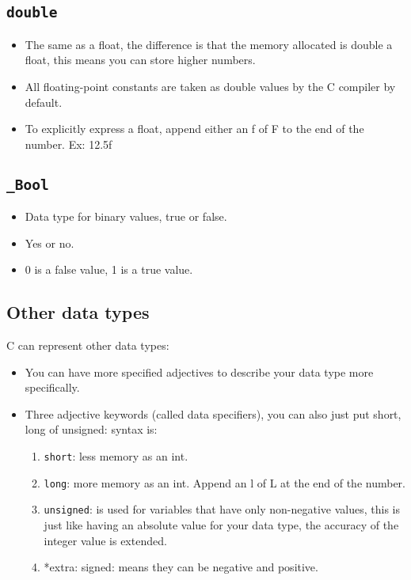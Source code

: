 \subsection{\texttt{double}}
\begin{itemize}
    \item The same as a float, the difference is that the memory allocated is double a float, this means you can store higher numbers. 
    \item All floating-point constants are taken as double values by the C compiler by default.
    \item To explicitly express a float, append either an f of F to the end of the number. Ex: 12.5f
\end{itemize}
\subsection{\texttt{_Bool}}
\begin{itemize}
    \item Data type for binary values, true or false. 
    \item Yes or no. 
    \item 0 is a false value, 1 is a true value. 
\end{itemize}
\subsection{Other data types}
C can represent other data types: 
\begin{itemize}
    \item You can have more specified adjectives to describe your data type more specifically. 
    \item Three adjective keywords (called data specifiers), you can also just put short, long of unsigned: syntax is:   
        \begin{enumerate}
            \item \texttt{short}: less memory as an int. 
            \item \texttt{long}: more memory as an int. Append an l of L at the end of the number. 
            \item \texttt{unsigned}: is used for variables that have only non-negative values, this is just like having an absolute value for your data type, the accuracy of the integer value is extended. 
            \item *extra: signed: means they can be negative and positive. 
        \end{enumerate}
\end{itemize}
